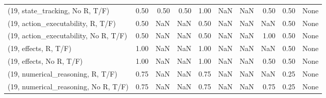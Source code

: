 \begin{table*}[h!]
\begin{adjustbox}{width=2\columnwidth,center}
\begin{tabular}{lrrr|rrr|rrr}
(19, state\_tracking, No R, T/F)       &                      0.50 &                  0.50 &                      0.50 &                          1.00 &                       NaN &                           NaN &                                   0.50 &                               0.50 &                                  None \\
(19, action\_executability, R, T/F)    &                      0.50 &                   NaN &                       NaN &                          0.50 &                       NaN &                           NaN &                                    NaN &                               0.50 &                                  None \\
(19, action\_executability, No R, T/F) &                      0.50 &                   NaN &                       NaN &                          0.50 &                       NaN &                           NaN &                                   1.00 &                               0.50 &                                  None \\
(19, effects, R, T/F)                 &                      1.00 &                   NaN &                       NaN &                          1.00 &                       NaN &                           NaN &                                    NaN &                               0.50 &                                  None \\
(19, effects, No R, T/F)              &                      1.00 &                   NaN &                       NaN &                          1.00 &                       NaN &                           NaN &                                   0.50 &                               0.50 &                                  None \\
(19, numerical\_reasoning, R, T/F)     &                      0.75 &                   NaN &                       NaN &                          0.75 &                       NaN &                           NaN &                                    NaN &                               0.25 &                                  None \\
(19, numerical\_reasoning, No R, T/F)  &                      0.75 &                   NaN &                       NaN &                          0.75 &                       NaN &                           NaN &                                   0.75 &                               0.25 &                                  None \\

\end{tabular}
\end{adjustbox}
\end{table*}

